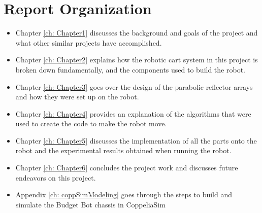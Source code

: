 \section{Report Organization}
\begin{itemize}
    \item Chapter \ref{ch: Chapter1} discusses the background and goals of the project and what other similar projects have accomplished.
    \item Chapter \ref{ch: Chapter2} explains how the robotic cart system in this project is broken down fundamentally, and the components used to build the robot.
    \item Chapter \ref{ch: Chapter3} goes over the design of the parabolic reflector arrays and how they were set up on the robot.
    \item Chapter \ref{ch: Chapter4} provides an explanation of the algorithms that were used to create the code to make the robot move.
    \item Chapter \ref{ch: Chapter5} discusses the implementation of all the parts onto the robot and the experimental results obtained when running the robot.
    \item Chapter \ref{ch: Chapter6} concludes the project work and discusses future endeavors on this project.
    \item Appendix \ref{ch: coppSimModeling} goes through the steps to build and simulate the Budget Bot chassis in CoppeliaSim
\end{itemize}

